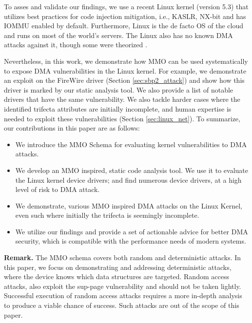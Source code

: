 To asses and validate our findings, we use a recent Linux kernel (version 5.3) that utilizes best practices for code injection mitigation, i.e., KASLR, NX-bit and has IOMMU enabled by default. Furthermore, Linux is the de facto OS of the cloud and runs on most of the world's servers. The Linux also has no known DMA attacks against it, though some were theorized \cite{MMT16,thunder}. 

Nevertheless, in this work, we demonstrate how MMO can be used systematically to expose DMA vulnerabilities in the Linux kernel. For example, we demonstrate an exploit on the FireWire \spb driver (Section \ref{sec:sbp2_attack}) and show how this driver is marked by our static analysis tool. We also provide a list of notable drivers that have the same vulnerability. We also tackle harder cases where the identified trifecta attributes are initially incomplete, and human expertise is needed to exploit these vulnerabilities (Section \ref{sec:linux_net}). To summarize, our contributions in this paper are as follows:
\begin{itemize}
    \item We introduce the MMO Schema for evaluating kernel vulnerabilities to DMA attacks. 
    \item We develop an MMO inspired, static code analysis tool. We use it to evaluate the Linux kernel device drivers; and find numerous device drivers, at a high level of risk to DMA attack.
    \item We demonstrate, various MMO inspired DMA attacks on the Linux Kernel, even such where initially the trifecta is seemingly incomplete. 
    \item We utilize our findings and provide a set of actionable advice for better DMA security, which is compatible with the performance needs of modern systems.
\end{itemize}

\noindent\textbf{Remark.} The MMO schema covers both random and deterministic attacks. In this paper, we focus on demonstrating and addressing deterministic attacks, where the device knows which data structures are targeted. Random access attacks, also exploit the sup-page vulnerability and should not be taken lightly. Successful execution of random access attacks requires a more in-depth analysis to produce a viable chance of success. Such attacks are out of the scope of this paper. 